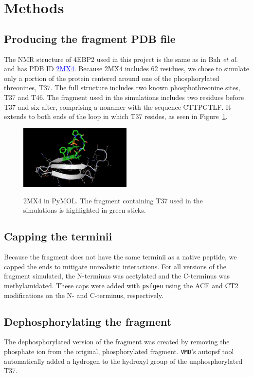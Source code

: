 \section{Methods} %
\label{sec:methods}

\subsection{Producing the fragment PDB file}
The NMR structure of 4EBP2 used in this project is the same as in Bah \textit{et al.}
and has PDB ID \href{http://www.rcsb.org/pdb/explore/explore.do?structureId=2MX4}{\textcolor{blue}{2MX4}}.
Because 2MX4 includes 62 residues, we chose to simulate only a portion of the protein centered around one of the phosphorylated threonines, T37.
The full structure includes two known phosphothreonine sites, T37 and T46.
The fragment used in the simulations includes two residues before T37 and six after, comprising a nonamer with the sequence CTTPGTLF.
It extends to both ends of the loop in which T37 resides, as seen in Figure~\ref{fig:2MX4}.

\begin{figure}[h!]
  \caption{2MX4 in PyMOL. The fragment containing T37 used in the simulations is highlighted in green sticks.}
  \centering
    \includegraphics[width=0.5\textwidth]{2MX4}
  \label{fig:2MX4}
\end{figure}

\subsection{Capping the terminii}
Because the fragment does not have the same terminii as a native peptide, we capped the ends to mitigate unrealistic interactions.
For all versions of the fragment simulated, the N-terminus was acetylated and the C-terminus was methylamidated.
These caps were added with \texttt{psfgen} using the ACE and CT2 modifications on the N- and C-terminus, respectively.

\subsection{Dephosphorylating the fragment}
The dephosphorylated version of the fragment was created by removing the phosphate ion from the original, phosphorylated fragment.
\texttt{VMD}'s autopsf tool automatically added a hydrogen to the hydroxyl group of the unphosphorylated T37.

